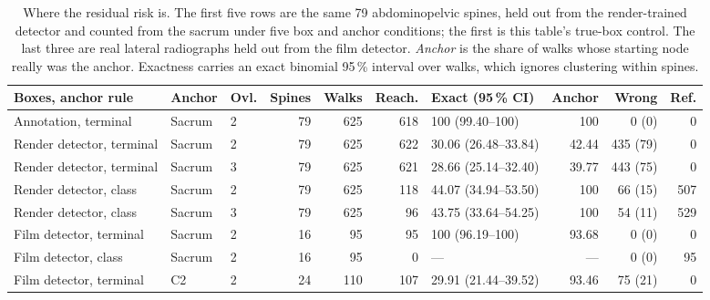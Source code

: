 \documentclass[11pt,letterpaper]{article}
\begin{document}
\begin{table}[htbp]\centering\footnotesize\setlength\tabcolsep{4pt}
\caption{Where the residual risk is. The first five rows are the same 79 abdominopelvic spines, held out
from the render-trained detector and counted from the sacrum under five box and anchor conditions; the
first is this table's true-box control. The last three are real lateral radiographs held out from the film
detector. \emph{Anchor} is the share of walks whose starting node really was the anchor. Exactness carries
an exact binomial 95\,\% interval over walks, which ignores clustering within spines.}
\label{tab:boxes}
\begin{tabular}{lllrrrlrrr}
\toprule
Boxes, anchor rule & Anchor & Ovl. & Spines & Walks & Reach. & Exact (95\,\% CI) & Anchor & Wrong & Ref. \\
\midrule
Annotation, terminal      & Sacrum & 2 & 79 & 625 & 618 & 100 (99.40--100)     & 100   &   0 (0) &   0 \\
Render detector, terminal & Sacrum & 2 & 79 & 625 & 622 & 30.06 (26.48--33.84) & 42.44 & 435 (79) &   0 \\
Render detector, terminal & Sacrum & 3 & 79 & 625 & 621 & 28.66 (25.14--32.40) & 39.77 & 443 (75) &   0 \\
Render detector, class    & Sacrum & 2 & 79 & 625 & 118 & 44.07 (34.94--53.50) & 100   &  66 (15) & 507 \\
Render detector, class    & Sacrum & 3 & 79 & 625 &  96 & 43.75 (33.64--54.25) & 100   &  54 (11) & 529 \\
\midrule
Film detector, terminal   & Sacrum & 2 & 16 &  95 &  95 & 100 (96.19--100)     & 93.68 &   0 (0) &   0 \\
Film detector, class      & Sacrum & 2 & 16 &  95 &   0 & ---                  & ---   &   0 (0) &  95 \\
Film detector, terminal   & C2     & 2 & 24 & 110 & 107 & 29.91 (21.44--39.52) & 93.46 &  75 (21) &   0 \\
\bottomrule
\end{tabular}
\end{table}

\clearpage


\end{document}
